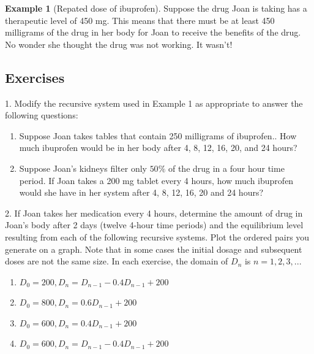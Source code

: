 \documentclass[10pt,]{book}
\theoremstyle{plain}
\theoremstyle{definition}
\theoremstyle{definition}
\newtheorem{example}[theorem]{Example}
\theoremstyle{definition}
\numberwithin{equation}{section}
\begin{document}
\begin{example}[Repated dose of ibuprofen]
\par
Suppose the drug Joan is taking has a therapeutic level of 450 mg.  This means that there must be at least 450 milligrams of the drug in her body for Joan to receive the benefits of the drug.  No wonder she thought the drug was not working.  It wasn’t!%
\end{example}
\typeout{************************************************}
\typeout{************************************************}
\subsection[{Exercises}]{Exercises}\label{exercises-2}
\begin{exerciselist}
\item[1.]\hypertarget{exercise-3}{}Modify the recursive  system  used in Example 1 as appropriate to answer the following questions: \leavevmode%
\begin{enumerate}[label=(\alph*)]
\item\hypertarget{li-7}{}Suppose Joan takes tables that contain 250 milligrams of ibuprofen..  How much ibuprofen would be in her body after 4, 8, 12, 16, 20, and 24 hours?%
\item\hypertarget{li-8}{}Suppose Joan’s kidneys filter only \(50\%\) of the drug in a four hour time period.  If Joan takes a 200 mg tablet every 4 hours, how much ibuprofen would she  have in her system after  4, 8, 12, 16, 20 and 24 hours?%
\end{enumerate}
%
\par\smallskip
\item[2.]\hypertarget{exercise-4}{}If Joan takes her medication every 4 hours, determine the amount of drug in Joan’s body after 2 days (twelve  4-hour time periods) and the equilibrium level resulting from each of the following recursive systems.  Plot the ordered pairs you generate on a graph.  Note that in some cases the initial dosage and subsequent doses are not the same size.  In each exercise, the domain of \(D_n\) is \(n=1,2,3, ...\) \leavevmode%
\begin{enumerate}[label=(\alph*)]
\item\hypertarget{li-9}{}\(D_0=200, D_n=D_{n-1} - 0.4D_{n-1} + 200\)%
\item\hypertarget{li-10}{}\(D_0=800, D_n=0.6D_{n-1} + 200\)%
\item\hypertarget{li-11}{}\(D_0=600, D_n=0.4D_{n-1} + 200\)%
\item\hypertarget{li-12}{}\(D_0=600, D_n=D_{n-1} - 0.4D_{n-1} + 200\)%

\end{enumerate}
\end{exerciselist}
\end{document}
